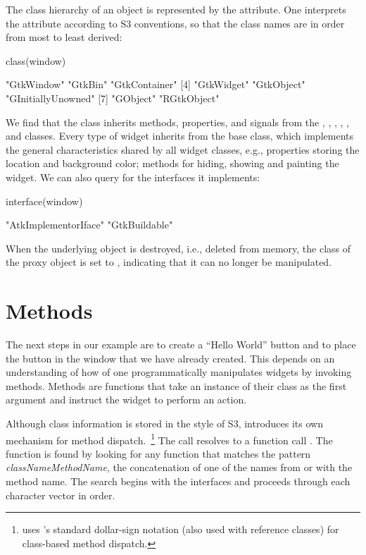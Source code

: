 The class hierarchy of an object is represented by the
 attribute. One interprets the attribute according to S3
conventions, so that the class names are in order from most to least
derived:
\begin{Schunk}
\begin{Sinput}
 class(window)
\end{Sinput}
\end{Schunk}
\begin{Soutput}
[1] "GtkWindow"   "GtkBin"      "GtkContainer"     
[4] "GtkWidget"   "GtkObject"   "GInitiallyUnowned"
[7] "GObject"     "RGtkObject" 
\end{Soutput}
%
We find that the  class inherits methods,
properties, and signals from the , ,
, , , and
 classes. Every type of  widget inherits from
the base  class, which implements the general
characteristics shared by all widget classes, e.g., properties storing
the location and background color; methods for hiding, showing and
painting the widget. We can also query  for the
interfaces it implements:
\begin{Schunk}
\begin{Sinput}
 interface(window)
\end{Sinput}
\begin{Soutput}
[1] "AtkImplementorIface" "GtkBuildable"       
\end{Soutput}
\end{Schunk}

When the underlying \GTK\/ object is destroyed, i.e., deleted
from memory, the class of the proxy object is set to ,
indicating that it can no longer be manipulated.

\section{Methods}

The next steps in our example are to create a ``Hello World'' button
and to place the button in the window that we have already
created. This depends on an understanding of how of one
programmatically manipulates widgets by invoking methods.  Methods are
functions that take an instance of their class as the first argument
and instruct the widget to perform an action.

Although class information is stored in the style of S3, 
introduces its own mechanism for method
dispatch.~\footnote{ uses \R's standard dollar-sign
  notation (also used with reference classes) for class-based method
  dispatch.}  The call   resolves to a function
call . The function is found by looking for any
function that matches the pattern \emph{classNameMethodName}, the
concatenation of one of the names from  or
 with the method name. The search begins with the
interfaces and proceeds through each character vector in order.

